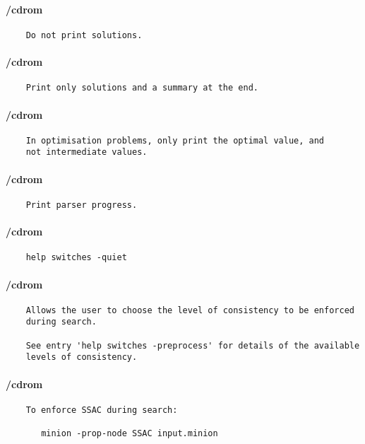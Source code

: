 \paragraph{/cdrom}
{\footnotesize
\begin{verbatim}
    Do not print solutions.
\end{verbatim}
}
\paragraph{/cdrom}
{\footnotesize
\begin{verbatim}
    Print only solutions and a summary at the end.
\end{verbatim}
}
\paragraph{/cdrom}
{\footnotesize
\begin{verbatim}
    In optimisation problems, only print the optimal value, and
    not intermediate values.
\end{verbatim}
}
\paragraph{/cdrom}
{\footnotesize
\begin{verbatim}
    Print parser progress.
\end{verbatim}
}
\paragraph{/cdrom}
{\footnotesize
\begin{verbatim}
    help switches -quiet
\end{verbatim}
}
\paragraph{/cdrom}
{\footnotesize
\begin{verbatim}
    Allows the user to choose the level of consistency to be enforced
    during search.

    See entry 'help switches -preprocess' for details of the available
    levels of consistency.
\end{verbatim}
}
\paragraph{/cdrom}
{\footnotesize
\begin{verbatim}
    To enforce SSAC during search:

       minion -prop-node SSAC input.minion
\end{verbatim}
}
